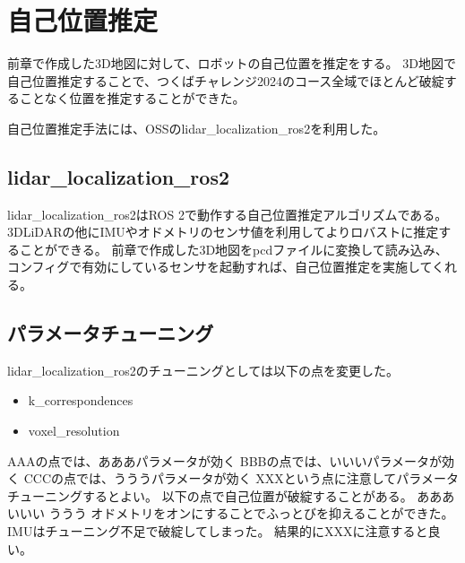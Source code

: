 \section{自己位置推定}
前章で作成した3D地図に対して、ロボットの自己位置を推定をする。
3D地図で自己位置推定することで、つくばチャレンジ2024のコース全域でほとんど破綻することなく位置を推定することができた。

自己位置推定手法には、OSSのlidar\_localization\_ros2\cite{Localization}を利用した。

\subsection{lidar\_localization\_ros2}
lidar\_localization\_ros2はROS 2で動作する自己位置推定アルゴリズムである。
3DLiDARの他にIMUやオドメトリのセンサ値を利用してよりロバストに推定することができる。
前章で作成した3D地図をpcdファイルに変換して読み込み、コンフィグで有効にしているセンサを起動すれば、自己位置推定を実施してくれる。

\subsection{パラメータチューニング}
lidar\_localization\_ros2のチューニングとしては以下の点を変更した。
\begin{itemize}
    \item k\_correspondences
    \item voxel\_resolution
\end{itemize}
AAAの点では、あああパラメータが効く
BBBの点では、いいいパラメータが効く
CCCの点では、うううパラメータが効く
XXXという点に注意してパラメータチューニングするとよい。
以下の点で自己位置が破綻することがある。
あああ
いいい
ううう
オドメトリをオンにすることでふっとびを抑えることができた。
IMUはチューニング不足で破綻してしまった。
結果的にXXXに注意すると良い。